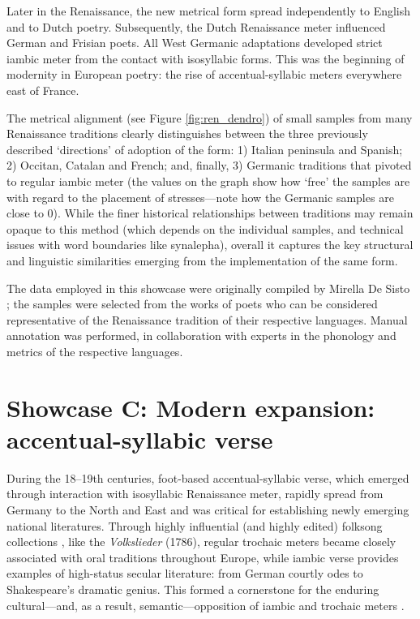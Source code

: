 \documentclass[
    hf
]{ceurart}
\begin{document}
Later in the Renaissance, the new metrical form spread independently to English and to Dutch poetry. Subsequently, the Dutch Renaissance meter influenced German and Frisian poets. All West Germanic adaptations developed strict iambic meter from the contact with isosyllabic forms. This was the beginning of modernity in European poetry: the rise of accentual-syllabic meters everywhere east of France.

The metrical alignment (see Figure \ref{fig:ren_dendro}) of small samples from many Renaissance traditions clearly distinguishes between the three previously described ‘directions’ of adoption of the form: 1) Italian peninsula and Spanish; 2) Occitan, Catalan and French; and, finally, 3) Germanic traditions that pivoted to regular iambic meter (the values on the graph show how ‘free’ the samples are with regard to the placement of stresses---note how the Germanic samples are close to 0). While the finer historical relationships between traditions may remain opaque to this method (which depends on the individual samples, and technical issues with word boundaries like synalepha), overall it captures the key structural and linguistic similarities emerging from the implementation of the same form.

The data employed in this showcase were originally compiled by Mirella De Sisto \cite{de_sisto_interaction_2020}; the samples were selected from the works of poets who can be considered representative of the Renaissance tradition of their respective languages. Manual annotation was performed, in collaboration with experts in the phonology and metrics of the respective languages.

\section{Showcase C: Modern expansion: accentual-syllabic verse}

During the 18--19th centuries, foot-based accentual-syllabic verse, which emerged through interaction with isosyllabic Renaissance meter, rapidly spread from Germany to the North and East \cite[207-209]{gasparov_history_1996} \cite{kazartsev_iambic_2022} and was critical for establishing newly emerging national literatures. Through highly influential (and highly edited) folksong collections  \cite{abrahams_phantoms_1993,leerssen_oral_2012}, like the \textit{Volkslieder} (1786), regular trochaic meters became closely associated with oral traditions throughout Europe, while iambic verse provides examples of high-status secular literature: from German courtly odes to Shakespeare's dramatic genius. This formed a cornerstone for the  enduring cultural---and, as a result, semantic---opposition of iambic and trochaic meters \cite{sela_semantics_2022}.
\end{document}
